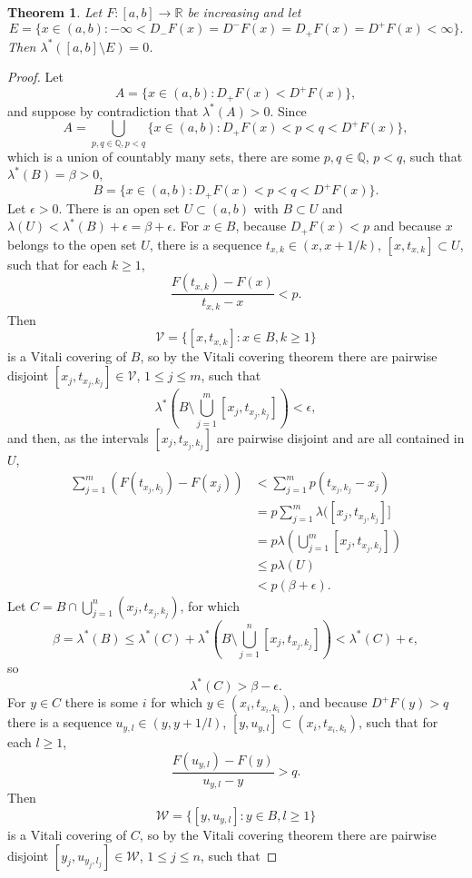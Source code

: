 \documentclass{article}
\newtheorem{theorem}{Theorem}
\theoremstyle{definition}
\begin{document}
\begin{theorem}
Let $F:[a,b] \to \mathbb{R}$ be increasing and let
\[
E = \{x \in (a,b) : -\infty<D_-F(x) = D^-F(x) = D_+F(x) = D^+F(x) <\infty\}.
\]
Then $\lambda^*([a,b] \setminus E) = 0$.
\end{theorem}
\begin{proof}
Let
\[
A = \{x \in (a,b) : D_+F(x) < D^+F(x)\},
\]
and suppose by contradiction that $\lambda^*(A)>0$. Since
\[
A = \bigcup_{p,q \in \mathbb{Q}, p<q}  \{x \in (a,b) : D_+F(x) <p<q< D^+F(x)\},
\]
which is a union of countably many sets, there are some $p,q \in \mathbb{Q}$, $p<q$, such that $\lambda^*(B)=\beta>0$, 
\[
B = \{x \in (a,b) : D_+F(x) <p<q< D^+F(x)\}.
\]
Let $\epsilon>0$. There is an open set $U \subset (a,b)$ with $B \subset U$ and $\lambda(U) < \lambda^*(B)+\epsilon=
\beta+\epsilon$. 
For $x \in B$, because $D_+F(x)<p$ and because $x$ belongs to the open set $U$, there is a sequence
$t_{x,k} \in (x,x+1/k)$, $[x,t_{x,k}] \subset U$, such that for each $k \geq 1$,
\[
\frac{F(t_{x,k})-F(x)}{t_{x,k}-x} < p.
\]
Then
\[
\mathcal{V} = \{[x,t_{x,k}]:x \in B, k \geq 1\}
\]
is a Vitali covering of $B$, so by the Vitali covering theorem there are 
pairwise disjoint $[x_j,t_{x_j,k_j}] \in \mathcal{V}$, $1 \leq j \leq m$, such that
\[
\lambda^* \left( B \setminus \bigcup_{j=1}^m [x_j,t_{x_j,k_j}] \right)<\epsilon,
\]
and then, as the intervals $[x_j,t_{x_j,k_j}]$ are pairwise disjoint and are all contained in $U$,
\begin{align*}
\sum_{j=1}^m (F(t_{x_j,k_j})-F(x_j)) &< \sum_{j=1}^m p(t_{x_j,k_j}-x_j)\\
&=p\sum_{j=1}^m \lambda([x_j,t_{x_j,k_j}]]\\
&=p\lambda\left( \bigcup_{j=1}^m [x_j,t_{x_j,k_j}]\right)\\
&\leq p \lambda(U)\\
&< p(\beta+\epsilon).
\end{align*}
Let $C=B \cap \bigcup_{j=1}^n (x_j,t_{x_j,k_j})$, for which
\[
\beta=\lambda^*(B) \leq \lambda^*(C) + \lambda^* \left( B \setminus \bigcup_{j=1}^n [x_j,t_{x_j,k_j}] \right)
< \lambda^*(C) + \epsilon,
\]
so
\[
\lambda^*(C)>\beta-\epsilon.
\] 
For $y \in C$ there is some  $i$ for which $y \in (x_i,t_{x_i,k_i})$, and 
because $D^+F(y)>q$ there is a sequence $u_{y,l} \in (y,y+1/l)$,
$[y,u_{y,l}] \subset (x_i,t_{x_i,k_i})$, such that for each $l \geq 1$,
\[
\frac{F(u_{y,l})-F(y)}{u_{y,l}-y} > q.
\]
Then
\[
\mathcal{W} = \{[y,u_{y,l}]: y \in B, l \geq 1\}
\]
is a Vitali covering of $C$, so by the Vitali covering theorem there are
pairwise disjoint $[y_j,u_{y_j,l_j}] \in \mathcal{W}$, $1 \leq j \leq n$, such that

\end{proof}
\end{document}
